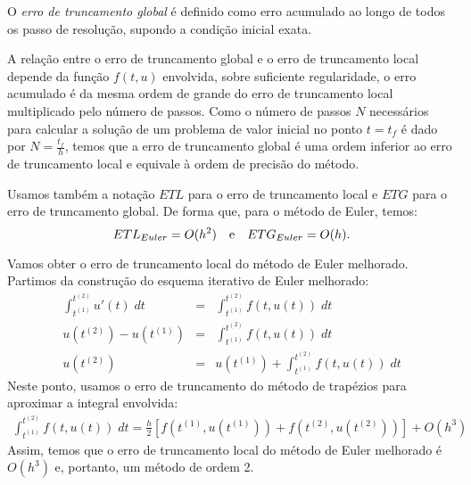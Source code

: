 \begin{defn} O \emph{erro de truncamento global} é definido como erro acumulado ao longo de todos os passo de resolução, supondo a condição inicial exata.
\end{defn}

A relação entre o erro de truncamento global e o erro de truncamento local depende da função $f(t,u)$ envolvida, sobre suficiente regularidade, o erro acumulado é da mesma ordem de grande do erro de truncamento local multiplicado pelo número de passos. Como o número de passos $N$ necessários para calcular a solução de um problema de valor inicial no ponto $t=t_{f}$ é dado por $N=\frac{t_f}{h}$, temos que a erro de truncamento global é uma ordem inferior ao erro de truncamento local e equivale à ordem de precisão do método.

Usamos também a notação $ETL$ para o erro de truncamento local e $ETG$ para o erro de truncamento global. De forma que, para o método de Euler, temos:
$$ETL_{Euler} = O(h^2) ~~~ \hbox{e} ~~~ ETG_{Euler}=O(h).$$
\begin{ex} Vamos obter o erro de truncamento local do método de Euler melhorado.
Partimos da construção do esquema iterativo de Euler melhorado:
\begin{eqnarray}
  \int_{t^{(1)}}^{t^{(2)}} u'(t) \;dt &=& \int_{t^{(1)}}^{t^{(2)}} f(t,u(t)) \; dt\\
  u(t^{(2)})-u(t^{(1)})               &=& \int_{t^{(1)}}^{t^{(2)}} f(t,u(t)) \; dt\\
  u(t^{(2)})                      &=& u(t^{(1)}) +  \int _{t^{(1)}}^{t^{(2)}} f(t,u(t)) \; dt
\end{eqnarray}
Neste ponto, usamos o erro de truncamento do método de trapézios para aproximar a integral envolvida:
\begin{eqnarray*}
\int _{t^{(1)}}^{t^{(2)}} f(t,u(t)) \; dt = \frac{h}{2}\left[f\left(t^{(1)},u(t^{(1)})\right) + f\left(t^{(2)},u(t^{(2)})\right)\right] + O(h^3)
\end{eqnarray*}
Assim, temos que o erro de truncamento local do método de Euler melhorado é $O(h^3)$ e, portanto, um método de ordem 2.
\end{ex}

